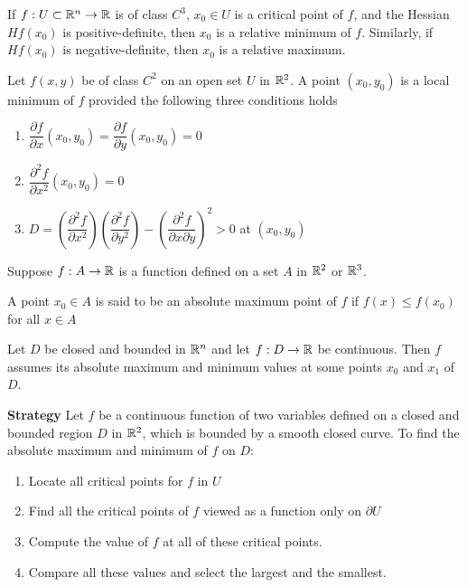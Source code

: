 \begin{thm*}
	If $f: U \subset \mathbb{R}^n \rightarrow \mathbb{R}$ is of class $C^3$, $x_0 \in U$ is a critical point of $f$, and the Hessian $Hf(x_0)$ is positive-definite, then $x_0$ is a relative minimum of $f$. Similarly, if $Hf(x_0)$ is negative-definite, then $x_0$ is a relative maximum.
\end{thm*}

\begin{thm*}
	Let $f(x,y)$ be of class $C^2$ on an open set $U$ in $\mathbb{R}^2$. A point $(x_0,y_0)$ is a local minimum of $f$ provided the following three conditions holds
	\begin{enumerate}[label = $\roman* )$]
		\item $\dfrac{\partial f}{\partial x}(x_0,y_0) = \dfrac{\partial f}{\partial y}(x_0,y_0) = 0$
		\item $\dfrac{\partial^2 f}{\partial x^2}(x_0,y_0) = 0$
		\item $D = \left( \dfrac{\partial^2 f}{\partial x^2}\right) \left( \dfrac{\partial^2 f}{\partial y^2}\right) - \left( \dfrac{\partial^2 f}{\partial x \partial y}\right)^2 > 0$ at $(x_0,y_0)$	
	\end{enumerate}
	
\end{thm*}


\begin{defn}
	Suppose $f:A \rightarrow \mathbb{R}$ is a function defined on a set $A$	in $\mathbb{R}^2$ or $\mathbb{R}^3$.
	
	A point $x_0 \in A$ is said to be an absolute maximum point of $f$ if $f(x) \leq f(x_0)$ for all $x \in A$
\end{defn}

\begin{thm*}
	Let $D$ be closed and bounded in $\mathbb{R}^n$ and let $f: D \rightarrow \mathbb{R}$ be continuous. Then $f$ assumes its absolute maximum and minimum values at some points $x_0$ and $x_1$ of $D$.	
\end{thm*}


\textbf{Strategy} Let $f$ be a continuous function of two variables defined on a closed and bounded region $D$ in $\mathbb{R}^2$, which is bounded by a smooth closed curve. To find the absolute maximum and minimum of $f$ on $D$:

\begin{enumerate}[wide, label = \roman*)]
	\item	Locate all critical points for $f$ in $U$
	\item Find all the critical points of $f$ viewed as a function only on $\partial U$
	\item Compute the value of $f$ at all of these critical points.
	\item Compare all these values and select the largest and the smallest.
\end{enumerate}

